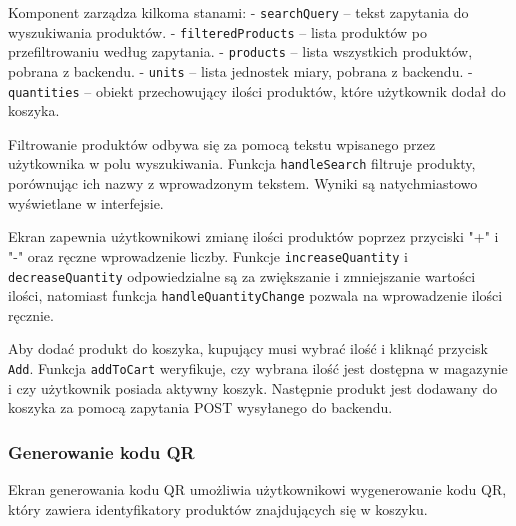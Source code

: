 Komponent zarządza kilkoma stanami:
- \texttt{searchQuery} – tekst zapytania do wyszukiwania produktów.
- \texttt{filteredProducts} – lista produktów po przefiltrowaniu według zapytania.
- \texttt{products} – lista wszystkich produktów, pobrana z backendu.
- \texttt{units} – lista jednostek miary, pobrana z backendu.
- \texttt{quantities} – obiekt przechowujący ilości produktów, które użytkownik dodał do koszyka.

Filtrowanie produktów odbywa się za pomocą tekstu wpisanego przez użytkownika w polu wyszukiwania. Funkcja \texttt{handleSearch} filtruje produkty, porównując ich nazwy z wprowadzonym tekstem. Wyniki są natychmiastowo wyświetlane w interfejsie.

Ekran zapewnia użytkownikowi zmianę ilości produktów poprzez przyciski "+" i "-" oraz ręczne wprowadzenie liczby. Funkcje \texttt{increaseQuantity} i \texttt{decreaseQuantity} odpowiedzialne są za zwiększanie i zmniejszanie wartości ilości, natomiast funkcja \texttt{handleQuantityChange} pozwala na wprowadzenie ilości ręcznie.

Aby dodać produkt do koszyka, kupujący musi wybrać ilość i kliknąć przycisk \texttt{Add}. Funkcja \texttt{addToCart} weryfikuje, czy wybrana ilość jest dostępna w magazynie i czy użytkownik posiada aktywny koszyk. Następnie produkt jest dodawany do koszyka za pomocą zapytania POST wysyłanego do backendu.

\subsubsection{Generowanie kodu QR}

Ekran generowania kodu QR umożliwia użytkownikowi wygenerowanie kodu QR, który zawiera identyfikatory produktów znajdujących się w koszyku.

